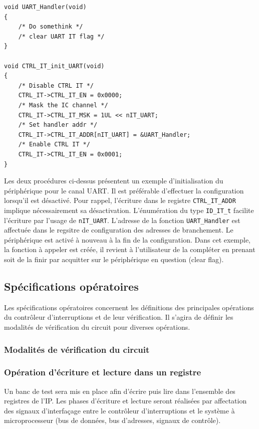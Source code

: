 \begin{lstlisting}[style=CStyle]
void UART_Handler(void)
{
    /* Do somethink */
    /* clear UART IT flag */
}

void CTRL_IT_init_UART(void)
{
    /* Disable CTRL IT */
    CTRL_IT->CTRL_IT_EN = 0x0000;
    /* Mask the IC channel */
    CTRL_IT->CTRL_IT_MSK = 1UL << nIT_UART;
    /* Set handler addr */
    CTRL_IT->CTRL_IT_ADDR[nIT_UART] = &UART_Handler;
    /* Enable CTRL IT */
    CTRL_IT->CTRL_IT_EN = 0x0001;
}
\end{lstlisting}
Les deux procédures ci-dessus présentent un exemple d'initialisation du périphérique pour le canal \gls{UART}.
Il est préférable d'effectuer la configuration lorsqu'il est désactivé.
Pour rappel, l'écriture dans le registre \texttt{CTRL\_IT\_ADDR} implique nécessairement sa désactivation.
L'énumération du type \texttt{ID\_IT\_t} facilite l'écriture par l'usage de \texttt{nIT\_UART}.
L'adresse de la fonction \texttt{UART\_Handler} est affectuée dans le regsitre de configuration des adresses de branchement.
Le périphérique est activé à nouveau à la fin de la configuration.
Dans cet exemple, la fonction à appeler est créée, il revient à l'utilisateur de la compléter en prenant soit de la finir par acquitter sur le périphérique en question (clear flag).

\newpage

\subsection{Spécifications opératoires}

Les spécifications opératoires concernent les définitions des principales opérations du contrôleur d'interruptions et de leur vérification.
Il s'agira de définir les modalités de vérification du circuit pour diverses opérations.

\subsubsection{Modalités de vérification du circuit}

\subsubsection*{Opération d'écriture et lecture dans un registre}

Un banc de test sera mis en place afin d'écrire puis lire dans l'ensemble des registres de l'IP.
Les phases d'écriture et lecture seront réalisées par affectation des signaux d'interfaçage entre le contrôleur d'interruptions et le système à microprocesseur (bus de données, bus d'adresses, signaux de contrôle).


